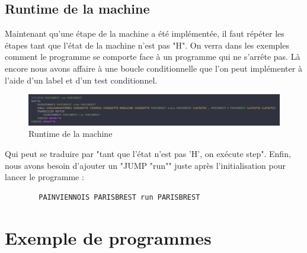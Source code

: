 \documentclass[11pt,colorlinks=true,a4paper]{article}
\begin{document}
    \subsection{Runtime de la machine}
    Maintenant qu'une étape de la machine a été implémentée, il faut répéter les étapes tant que l'état de la machine n'est pas "H". 
    On verra dans les exemples comment le programme se comporte face à un programme qui ne s'arrête pas. Là encore nous avons affaire 
    à une boucle conditionnelle que l'on peut implémenter à l'aide d'un label et d'un test conditionnel.\par \bigskip
    \begin{figure}[H]
        \center 
        \includegraphics[width=\textwidth]{img/runtime.png}
        \caption{Runtime de la machine}
    \end{figure}
    Qui peut se traduire par "tant que l'état n'est pas 'H', on exécute step". 
    Enfin, nous avons besoin d'ajouter un "JUMP "run"" juste après l'initialisation pour lancer le programme : 
    \begin{lstlisting}
        PAINVIENNOIS PARISBREST run PARISBREST
    \end{lstlisting}

    \section{Exemple de programmes}
\end{document}
